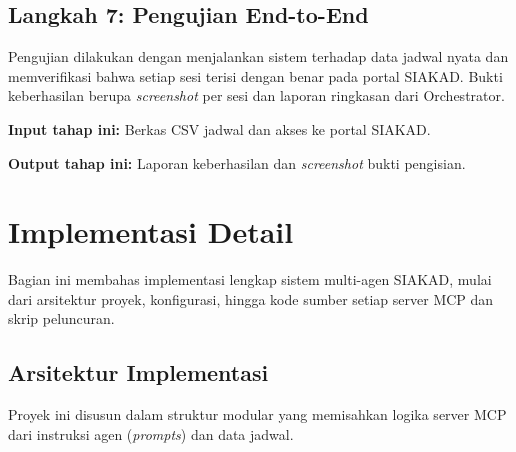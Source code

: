 \subsection{Langkah 7: Pengujian End-to-End}

Pengujian dilakukan dengan menjalankan sistem terhadap data jadwal nyata dan memverifikasi bahwa setiap sesi terisi dengan benar pada portal SIAKAD. Bukti keberhasilan berupa \textit{screenshot} per sesi dan laporan ringkasan dari Orchestrator.

\textbf{Input tahap ini:} Berkas CSV jadwal dan akses ke portal SIAKAD.

\textbf{Output tahap ini:} Laporan keberhasilan dan \textit{screenshot} bukti pengisian.
\section{Implementasi Detail}

Bagian ini membahas implementasi lengkap sistem multi-agen SIAKAD, mulai dari arsitektur proyek, konfigurasi, hingga kode sumber setiap server MCP dan skrip peluncuran.

\subsection{Arsitektur Implementasi}

Proyek ini disusun dalam struktur modular yang memisahkan logika server MCP dari instruksi agen (\textit{prompts}) dan data jadwal.

